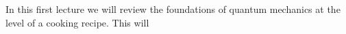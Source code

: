 In this first lecture we will review the foundations of quantum mechanics at the level of a cooking recipe. This will
